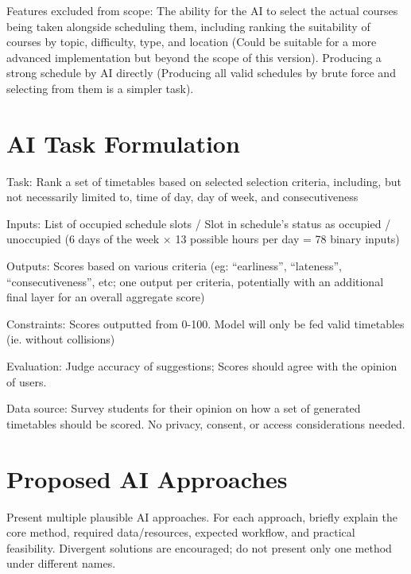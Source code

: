 \documentclass{article}
\begin{document}
Features excluded from scope: The ability for the AI to select the actual courses being taken alongside scheduling them, including ranking the suitability of courses by topic, difficulty, type, and location (Could be suitable for a more advanced implementation but beyond the scope of this version). Producing a strong schedule by AI directly (Producing all valid schedules by brute force and selecting from them is a simpler task).


\section{AI Task Formulation}

Task: Rank a set of timetables based on selected selection criteria, including, but not necessarily limited to, time of day, day of week, and consecutiveness

Inputs: List of occupied schedule slots / Slot in schedule’s status as occupied / unoccupied (6 days of the week × 13 possible hours per day = 78 binary inputs)

Outputs: Scores based on various criteria (eg: “earliness”, “lateness”, “consecutiveness”, etc; one output per criteria, potentially with an additional final layer for an overall aggregate score)

Constraints: Scores outputted from 0-100. Model will only be fed valid timetables (ie. without collisions)

Evaluation: Judge accuracy of suggestions; Scores should agree with the opinion of users.

Data source: Survey students for their opinion on how a set of generated timetables should be scored. No privacy, consent, or access considerations needed.

\section{Proposed AI Approaches}

Present multiple plausible AI approaches. For each approach, briefly explain the core method, required data/resources, expected workflow, and practical feasibility. Divergent solutions are encouraged; do not present only one method under different names.
\end{document}
